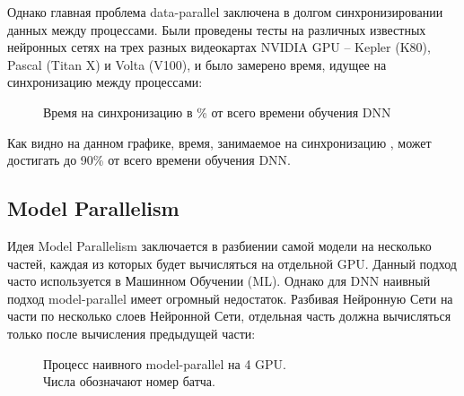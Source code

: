 \indent\setlength{\parindent}{1em} 
Однако главная проблема data-parallel заключена в долгом синхронизировании данных между процессами. Были проведены тесты на различных известных нейронных сетях на трех разных видеокартах NVIDIA GPU -- Kepler (K80), Pascal (Titan X) и Volta (V100), и было замерено время, идущее на синхронизацию между процессами:

\begin{figure}[h]%
	\centering
	\caption{Время на синхронизацию в \% от всего времени обучения DNN}
	\label{framework} %
\end{figure}

\indent\setlength{\parindent}{1em} 
Как видно на данном графике, время, занимаемое на синхронизацию , может достигать до 90\% от всего времени обучения DNN.

\newpage
\subsection{Model Parallelism}
Идея Model Parallelism заключается в разбиении самой модели на несколько частей, каждая из которых будет вычисляться на отдельной GPU. Данный подход часто используется в Машинном Обучении (ML). Однако для DNN наивный подход model-parallel имеет огромный недостаток. Разбивая Нейронную Сети на части по несколько слоев Нейронной Сети, отдельная часть должна вычисляться только после вычисления предыдущей части:

\begin{figure}[h]%
	\centering
	\caption{Процесс наивного model-parallel на 4 GPU. \\Числа обозначают номер батча.}
	\label{framework} %
\end{figure}

